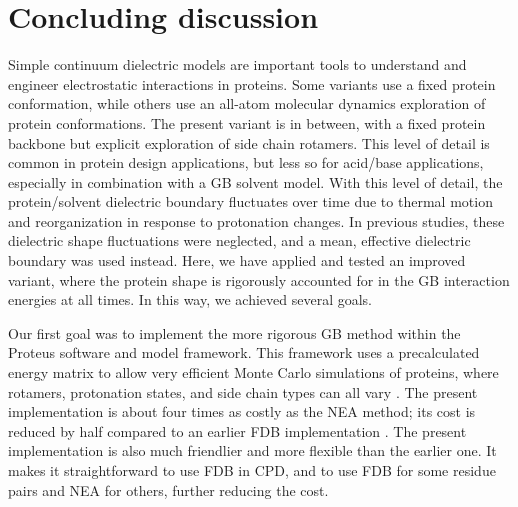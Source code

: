 \documentclass[a4paper,12pt]{article}
\begin{document}
\section{Concluding discussion}
Simple continuum dielectric models are important tools to understand and engineer electrostatic interactions in proteins.
Some variants use a fixed protein conformation, while others use an all-atom molecular dynamics exploration of protein
conformations. The present variant is in between, with a fixed protein backbone but explicit exploration of side chain
rotamers. This level of detail is common in protein design applications, but less so for acid/base applications, especially
in combination with a GB solvent model. With this level of detail, the protein/solvent dielectric boundary fluctuates over
time due to thermal motion and reorganization in response to protonation changes. In previous studies, these dielectric
shape fluctuations were neglected, and a mean, effective dielectric boundary was used instead. Here, we have applied and
tested an improved variant, where the protein shape is rigorously accounted for in the GB interaction energies at all times.
In this way, we achieved several goals.

Our first goal was to implement the more rigorous GB method within the Proteus software and model framework. This framework
uses a precalculated energy matrix to allow very efficient Monte Carlo simulations of proteins, where rotamers, protonation
states, and side chain types can all vary \cite{Simonson13,Mignon16}. The present implementation is about four times as costly
as the NEA method; its cost is reduced by half compared to an earlier FDB implementation \cite{Aleksandrov10b}. The present
implementation is also much friendlier and more flexible than the earlier one. It makes it straightforward to use FDB in
CPD, and to use FDB for some residue pairs and NEA for others, further reducing the cost.
\end{document}
